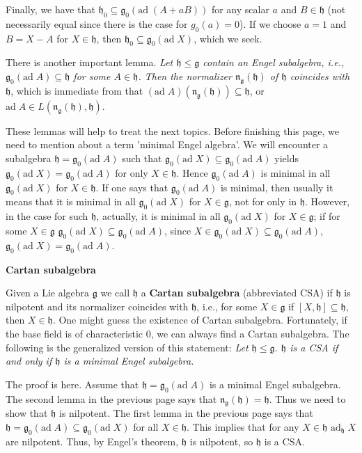 \documentclass{article}
\newcommand{\lie}[1]{\mathfrak{#1}}
\newcommand{\ad}[1]{\mathrm{ad}\; #1}
\newcommand{\adu}[2]{\mathrm{ad}_{#1}\; #2}
\begin{document}
Finally, we have that $\lie{h}_0 \subseteq \lie{g}_0(\ad{(A + aB)})$ for any scalar $a$ and $B \in \lie{h}$ (not necessarily equal since there is the case for $g_0(a) = 0$).
If we choose $a = 1$ and $B = X - A$ for $X \in \lie{h}$, then $\lie{h}_0 \subseteq \lie{g}_0(\ad{X})$, which we seek.

There is another important lemma.
\textit{Let $\lie{h} \le \lie{g}$ contain an Engel subalgebra, i.e., $\lie{g}_0(\ad{A}) \subseteq \lie{h}$ for some $A \in \lie{h}$.
Then the normalizer $\lie{n}_\lie{g}(\lie{h})$ of $\lie{h}$ coincides with $\lie{h}$}, which is immediate from that $(\ad{A})(\lie{n}_\lie{g}(\lie{h})) \subseteq \lie{h}$, or $\ad{A} \in L(\lie{n}_\lie{g}(\lie{h}), \lie{h})$.

These lemmas will help to treat the next topics.
Before finishing this page, we need to mention about a term 'minimal Engel algebra'.
We will encounter a subalgebra $\lie{h} = \lie{g}_0(\ad{A})$ such that $\lie{g}_0(\ad{X}) \subseteq \lie{g}_0(\ad{A})$ yields $\lie{g}_0(\ad{X}) = \lie{g}_0(\ad{A})$ for only $X \in \lie{h}$.
Hence $\lie{g}_0(\ad{A})$ is minimal in all $\lie{g}_0(\ad{X})$ for $X \in \lie{h}$.
If one says that $\lie{g}_0(\ad{A})$ is minimal, then usually it means that it is minimal in all $\lie{g}_0(\ad{X})$ for $X \in \lie{g}$, not for only in $\lie{h}$.
However, in the case for such $\lie{h}$, actually, it is minimal in all $\lie{g}_0(\ad{X})$ for $X \in \lie{g}$; if for some $X \in \lie{g}$ $\lie{g}_0(\ad{X}) \subseteq \lie{g}_0(\ad{A})$, since $X \in \lie{g}_0(\ad{X}) \subseteq \lie{g}_0(\ad{A})$, $\lie{g}_0(\ad{X}) = \lie{g}_0(\ad{A})$.

\newpage

\textbf{Cartan subalgebra}

Given a Lie algebra $\lie{g}$ we call $\lie{h}$ a \textbf{Cartan subalgebra} (abbreviated CSA) if $\lie{h}$ is nilpotent and its normalizer coincides with $\lie{h}$, i.e., for some $X \in \lie{g}$ if $[X, \lie{h}] \subseteq \lie{h}$, then $X \in \lie{h}$.
One might guess the existence of Cartan subalgebra.
Fortunately, if the base field is of characteristic 0, we can always find a Cartan subalgebra.
The following is the generalized version of this statement: 
\textit{Let $\lie{h} \le \lie{g}$.
$\lie{h}$ is a CSA if and only if $\lie{h}$ is a minimal Engel subalgebra.}

The proof is here.
Assume that $\lie{h} = \lie{g}_0(\ad{A})$ is a minimal Engel subalgebra.
The second lemma in the previous page says that $\lie{n}_\lie{g}(\lie{h}) = \lie{h}$.
Thus we need to show that $\lie{h}$ is nilpotent.
The first lemma in the previous page says that $\lie{h} = \lie{g}_0(\ad{A}) \subseteq \lie{g}_0(\ad{X})$ for all $X \in \lie{h}$.
This implies that for any $X \in \lie{h}$ $\adu{\lie{h}}{X}$ are nilpotent.
Thus, by Engel's theorem, $\lie{h}$ is nilpotent, so $\lie{h}$ is a CSA.
\end{document}
